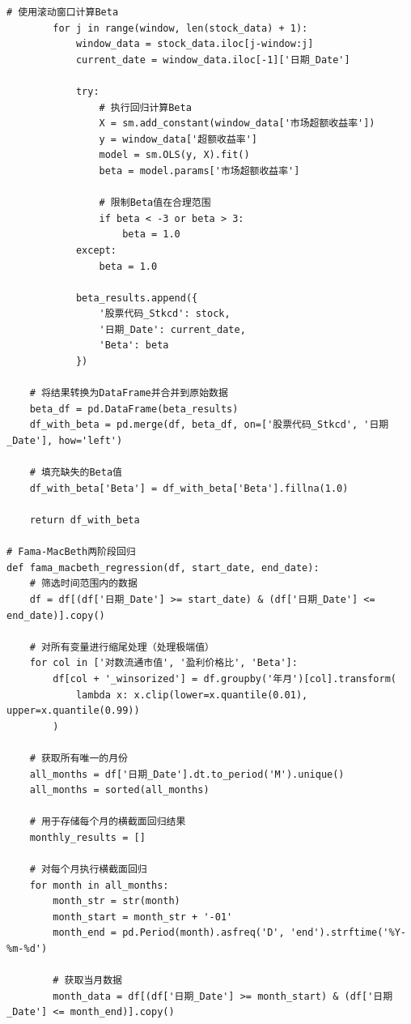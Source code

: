 \documentclass[12pt, a4paper]{article}
\begin{document}
\begin{lstlisting}[basicstyle=\small\ttfamily, breaklines=true, columns=fullflexible]
        # 使用滚动窗口计算Beta
        for j in range(window, len(stock_data) + 1):
            window_data = stock_data.iloc[j-window:j]
            current_date = window_data.iloc[-1]['日期_Date']
            
            try:
                # 执行回归计算Beta
                X = sm.add_constant(window_data['市场超额收益率'])
                y = window_data['超额收益率']
                model = sm.OLS(y, X).fit()
                beta = model.params['市场超额收益率']
                
                # 限制Beta值在合理范围
                if beta < -3 or beta > 3:
                    beta = 1.0
            except:
                beta = 1.0
            
            beta_results.append({
                '股票代码_Stkcd': stock,
                '日期_Date': current_date,
                'Beta': beta
            })
    
    # 将结果转换为DataFrame并合并到原始数据
    beta_df = pd.DataFrame(beta_results)
    df_with_beta = pd.merge(df, beta_df, on=['股票代码_Stkcd', '日期_Date'], how='left')
    
    # 填充缺失的Beta值
    df_with_beta['Beta'] = df_with_beta['Beta'].fillna(1.0)
    
    return df_with_beta

# Fama-MacBeth两阶段回归
def fama_macbeth_regression(df, start_date, end_date):
    # 筛选时间范围内的数据
    df = df[(df['日期_Date'] >= start_date) & (df['日期_Date'] <= end_date)].copy()
    
    # 对所有变量进行缩尾处理（处理极端值）
    for col in ['对数流通市值', '盈利价格比', 'Beta']:
        df[col + '_winsorized'] = df.groupby('年月')[col].transform(
            lambda x: x.clip(lower=x.quantile(0.01), upper=x.quantile(0.99))
        )
    
    # 获取所有唯一的月份
    all_months = df['日期_Date'].dt.to_period('M').unique()
    all_months = sorted(all_months)
    
    # 用于存储每个月的横截面回归结果
    monthly_results = []
    
    # 对每个月执行横截面回归
    for month in all_months:
        month_str = str(month)
        month_start = month_str + '-01'
        month_end = pd.Period(month).asfreq('D', 'end').strftime('%Y-%m-%d')
        
        # 获取当月数据
        month_data = df[(df['日期_Date'] >= month_start) & (df['日期_Date'] <= month_end)].copy()
        

\end{lstlisting}
\end{document}

